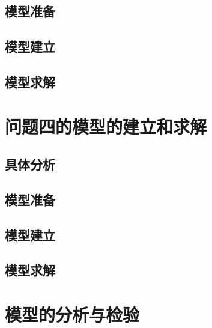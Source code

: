 \documentclass[withoutpreface,bwprint]{cumcmthesis}
\begin{document}
\subsection{模型准备}

\subsection{模型建立}

\subsection{模型求解}
















\newpage
\section{问题四的模型的建立和求解}
\subsection{具体分析}

\subsection{模型准备}

\subsection{模型建立}

\subsection{模型求解}











\newpage
\section{模型的分析与检验}
\end{document}
